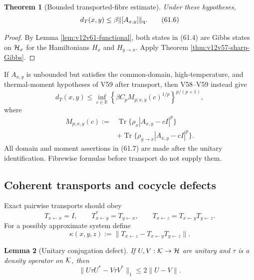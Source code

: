 \documentclass[11pt]{article}
\newtheorem{theorem}{Theorem}[section]
\newtheorem{lemma}[theorem]{Lemma}
\theoremstyle{remark}
\begin{document}
\begin{theorem}[Bounded transported-fibre estimate]
\label{thm:v12v61-bounded}
Under these hypotheses,
\begin{equation}
 d_T(x,y)
 \leq
 \beta\|[A_{x,y}]\|_{\rm q}.                      \tag{61.6}
\end{equation}
\end{theorem}

\begin{proof}
By Lemma \ref{lem:v12v61-functional}, both states in (61.4) are
Gibbs states on \({\cal H}_x\) for the Hamiltonians \(H_x\) and
\(H_{y\to x}\).  Apply Theorem
\ref{thm:v12v57-sharp-Gibbs}.
\end{proof}

If \(A_{x,y}\) is unbounded but satisfies the common-domain,
high-temperature, and thermal-moment hypotheses of V59 after
transport, then V58--V59 instead give
\begin{equation}
 d_T(x,y)
 \leq
 \inf_{c\in\mathbb R}
 \left\{\beta C_pM_{p;x,y}(c)^{1/p}\right\}^{p/(p+1)},        \tag{61.7}
\end{equation}
where
\begin{align}
 M_{p;x,y}(c)
 :={}&
 \operatorname{Tr}\{\rho_x|A_{x,y}-cI|^p\}
 \nonumber\\
 &+
 \operatorname{Tr}\{\rho_{y\to x}|A_{x,y}-cI|^p\}.           \tag{61.8}
\end{align}
All domain and moment assertions in (61.7) are made after the
unitary identification.  Fibrewise formulas before transport do not
supply them.

\subsection{Coherent transports and cocycle defects}

Exact pairwise transports should obey
\begin{equation}
 T_{x\leftarrow x}=I,\qquad
 T_{x\leftarrow y}^*=T_{y\leftarrow x},\qquad
 T_{x\leftarrow z}
 =
 T_{x\leftarrow y}T_{y\leftarrow z}.              \tag{61.9}
\end{equation}
For a possibly approximate system define
\begin{equation}
 \kappa(x,y,z)
 :=
 \|T_{x\leftarrow z}
   -T_{x\leftarrow y}T_{y\leftarrow z}\|.          \tag{61.10}
\end{equation}

\begin{lemma}[Unitary conjugation defect]
\label{lem:v12v61-unitary-defect}
If \(U,V:{\cal K}\to{\cal H}\) are unitary and \(\tau\) is a density
operator on \({\cal K}\), then
\begin{equation}
 \|U\tau U^*-V\tau V^*\|_1
 \leq2\|U-V\|.                                    \tag{61.11}
\end{equation}
\end{lemma}
\end{document}
